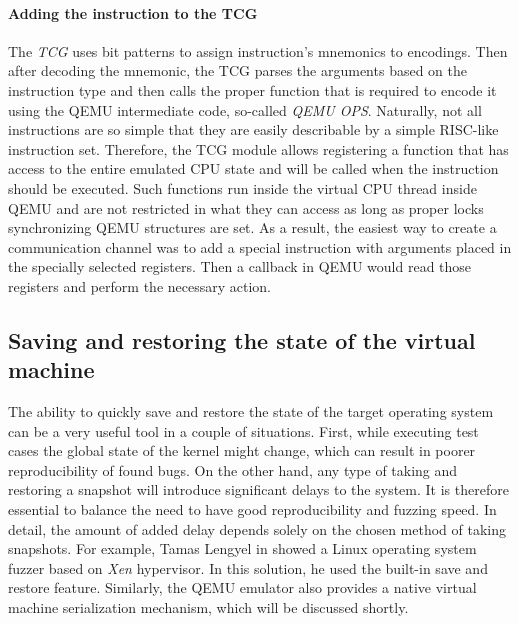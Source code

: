 \paragraph{Adding the instruction to the TCG}
The \textit{TCG} uses bit patterns to assign instruction's mnemonics to encodings. Then after decoding the mnemonic, the TCG parses the arguments based on the instruction type and then calls the proper function that is required to encode it using the QEMU intermediate code, so-called \textit{QEMU OPS}. Naturally, not all instructions are so simple that they are easily describable by a simple RISC-like instruction set. Therefore, the TCG module allows registering a function that has access to the entire emulated CPU state and will be called when the instruction should be executed. Such functions run inside the virtual CPU thread inside QEMU and are not restricted in what they can access as long as proper locks synchronizing QEMU structures are set. As a result, the easiest way to create a communication channel was to add a special instruction with arguments placed in the specially selected registers. Then a callback in QEMU would read those registers and perform the necessary action.

\subsection{Saving and restoring the state of the virtual machine} \label{sec:savevm}
The ability to quickly save and restore the state of the target operating system can be a very useful tool in a couple of situations. First, while executing test cases the global state of the kernel might change, which can result in poorer reproducibility of found bugs. On the other hand, any type of taking and restoring a snapshot will introduce significant delays to the system. It is therefore essential to balance the need to have good reproducibility and fuzzing speed. In detail, the amount of added delay depends solely on the chosen method of taking snapshots. For example, Tamas Lengyel in \cite{xenfuzz} showed a Linux operating system fuzzer based on \textit{Xen} hypervisor. In this solution, he used the built-in save and restore feature. Similarly, the QEMU emulator also provides a native virtual machine serialization mechanism, which will be discussed shortly.

